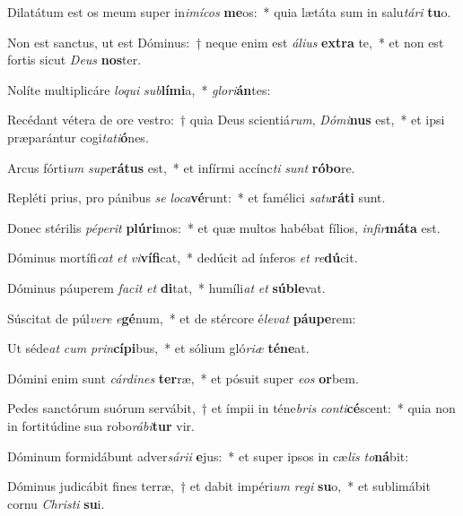 \item Dilatátum est os meum super in\textit{i}\textit{mí}\textit{cos} \textbf{me}os:~* quia lætáta sum in salu\textit{tá}\textit{ri} \textbf{tu}o.
\item Non est sanctus, ut est Dóminus:~† neque enim est \textit{á}\textit{li}\textit{us} \textbf{ex}\textbf{tra} te,~* et non est fortis sicut \textit{De}\textit{us} \textbf{nos}ter.
\item Nolíte multiplicáre \textit{lo}\textit{qui} \textit{sub}\textbf{lí}\textbf{mi}a,~* \textit{glo}\textit{ri}\textbf{án}tes:
\item Recédant vétera de ore vestro:~† quia Deus scientiá\textit{rum}, \textit{Dó}\textit{mi}\textbf{nus} est,~* et ipsi præparántur cogi\textit{ta}\textit{ti}\textbf{ó}nes.
\item Arcus fórti\textit{um} \textit{su}\textit{pe}\textbf{rá}\textbf{tus} est,~* et infírmi accínc\textit{ti} \textit{sunt} \textbf{ró}\textbf{bo}re.
\item Repléti prius, pro pánibus \textit{se} \textit{lo}\textit{ca}\textbf{vé}runt:~* et famélici \textit{sa}\textit{tu}\textbf{rá}\textbf{ti} sunt.
\item Donec stérilis \textit{pé}\textit{pe}\textit{rit} \textbf{plú}\textbf{ri}mos:~* et quæ multos habébat fílios, \textit{in}\textit{fir}\textbf{má}\textbf{ta} est.
\item Dóminus mortífi\textit{cat} \textit{et} \textit{vi}\textbf{ví}\textbf{fi}cat,~* dedúcit ad ínferos \textit{et} \textit{re}\textbf{dú}cit.
\item Dóminus páuperem \textit{fa}\textit{cit} \textit{et} \textbf{di}tat,~* humíli\textit{at} \textit{et} \textbf{súb}\textbf{le}vat.
\item Súscitat de púl\textit{ve}\textit{re} \textit{e}\textbf{gé}num,~* et de stércore é\textit{le}\textit{vat} \textbf{páu}\textbf{pe}rem:
\item Ut séde\textit{at} \textit{cum} \textit{prin}\textbf{cí}\textbf{pi}bus,~* et sólium gló\textit{ri}\textit{æ} \textbf{té}\textbf{ne}at.
\item Dómini enim sunt \textit{cár}\textit{di}\textit{nes} \textbf{ter}ræ,~* et pósuit super \textit{e}\textit{os} \textbf{or}bem.
\item Pedes sanctórum suórum servábit,~† et ímpii in téne\textit{bris} \textit{con}\textit{ti}\textbf{cé}scent:~* quia non in fortitúdine sua robo\textit{rá}\textit{bi}\textbf{tur} vir.
\item Dóminum formidábunt adver\textit{sá}\textit{ri}\textit{i} \textbf{e}jus:~* et super ipsos in cæ\textit{lis} \textit{to}\textbf{ná}bit:
\item Dóminus judicábit fines terræ,~† et dabit impéri\textit{um} \textit{re}\textit{gi} \textbf{su}o,~* et sublimábit cornu \textit{Chris}\textit{ti} \textbf{su}i.
